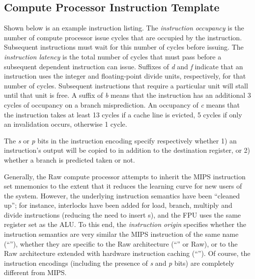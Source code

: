 \newcommand{\rawInstrEnd}{\end{minipage}\vspace{10mm}}
\newcommand{\rawInstrListEnd}{}
\codestretch

\newpage

\subsection{Compute Processor Instruction Template}

Shown below is an example instruction listing.  The {\em instruction occupancy} is the number of compute
processor issue cycles that are occupied by the instruction.  Subsequent instructions must wait for this
number of cycles before issuing.  The {\em instruction latency} is the total number of cycles that must pass
before a subsequent dependent instruction can issue. Suffixes of {\em d} and {\em f} indicate that an
instruction uses the integer and floating-point divide units, respectively, for that number of
cycles. Subsequent instructions that require a particular unit will stall until that unit is free. 
A suffix of {\em b} means that the instruction has an additional 3 cycles of occupancy on a branch misprediction.
An occupancy of {\em c} means that the instruction takes at least 13 cycles if a cache line is evicted,
5 cycles if only an invalidation occurs, otherwise 1 cycle.

The {\em s} or {\em p} bits in the instruction encoding specify respectively whether 1) an instruction's
output will be copied to  in addition to the destination register, or 2) whether a branch is
predicted taken or not.


Generally, the Raw compute processor attempts to inherit the MIPS instruction set mnemonics to the
extent that it reduces the learning curve for new users of the system.  However, the underlying instruction semantics
have been ``cleaned up''; for instance, interlocks have been added for load, branch, multiply 
and divide instructions (reducing the need to insert s), and the FPU uses the same register set as the ALU. To this
end, the {\em instruction origin} specifies whether the instruction semantics are very similar the MIPS
instruction of the same name (``\MIPSTag''), whether they are specific to the Raw architecture (``\RawTag'' or Raw),
or to the Raw architecture extended with hardware instruction caching (``\RawTagH''). Of course, the
instruction encodings (including the presence of {\em s} and {\em p} bits) are completely different from MIPS.

